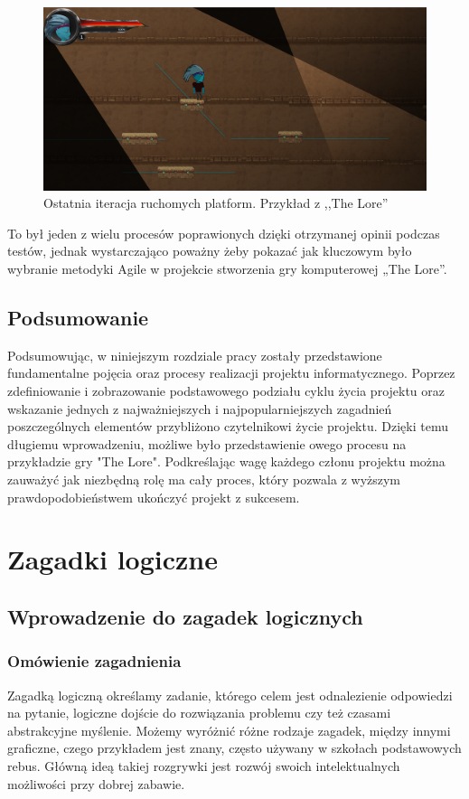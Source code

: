 \documentclass[oneside,polski,logo]{amuthesis}
\begin{document}
\begin{figure}[h]
	\centering
	\includegraphics[width=12cm]{images/hyps/platfAfter.png}
	\caption{Ostatnia iteracja ruchomych platform. Przykład z ,,The Lore''}
\end{figure}

To był jeden z wielu procesów poprawionych dzięki otrzymanej opinii podczas testów, jednak wystarczająco poważny żeby pokazać jak kluczowym było wybranie metodyki Agile w projekcie stworzenia gry komputerowej „The Lore”.\\

\section{Podsumowanie}
Podsumowując, w niniejszym rozdziale pracy zostały przedstawione fundamentalne pojęcia oraz procesy realizacji projektu informatycznego. Poprzez zdefiniowanie i zobrazowanie podstawowego podziału cyklu życia projektu oraz wskazanie jednych z najważniejszych i najpopularniejszych zagadnień poszczególnych elementów przybliżono czytelnikowi życie projektu. Dzięki temu długiemu wprowadzeniu, możliwe było przedstawienie owego procesu na przykładzie gry "The Lore". Podkreślając wagę każdego członu projektu można zauważyć jak niezbędną rolę ma cały proces, który pozwala z wyższym prawdopodobieństwem ukończyć projekt z sukcesem. 



\chapter{Zagadki logiczne}
\section{Wprowadzenie do zagadek logicznych}
\subsection{Omówienie zagadnienia}
\par Zagadką logiczną określamy zadanie, którego celem jest odnalezienie odpowiedzi na pytanie, logiczne dojście do rozwiązania problemu czy też czasami abstrakcyjne myślenie. Możemy wyróżnić różne rodzaje zagadek, między innymi graficzne, czego przykładem jest znany, często używany w szkołach podstawowych rebus. Główną ideą takiej rozgrywki jest rozwój swoich intelektualnych możliwości przy dobrej zabawie. \cite{zagadka_logiczna}
\end{document}
